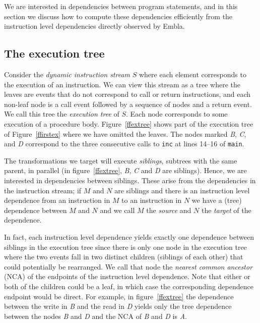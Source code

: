 \documentclass{acm_proc_article-sp}
\begin{document}
We are interested in dependencies between program statements, and in 
this section we discuss how to compute these dependencies efficiently from
the instruction level dependencies directly observed by Embla.

\subsection{The execution tree}

Consider the {\em dynamic instruction stream} $S$ where each element 
corresponds to the execution
of an instruction. We can view this stream as a tree where the leaves are 
events that do not correspond to call or return instructions, and each 
non-leaf node is a call
event followed by a sequence of nodes and a return event. We call
this tree the {\em execution tree} of $S$. 
Each node corresponds to some execution of a procedure body.
Figure~\ref{ffextree} shows part of
the execution tree of Figure~\ref{ffirstex} where we have omitted the 
leaves. The nodes marked {\it B}, {\it C}, and {\it D} correspond to 
the three consecutive calls to {\tt inc} at lines 14--16 of {\tt main}.

The transformations we target will execute {\em siblings}, subtrees with
the same parent, in parallel (in figure~\ref{ffextree}, {\it B}, {\it C} 
and {\it D} are siblings).  Hence, we 
are interested in dependencies between siblings. These
arise from the 
dependencies in the instruction stream; if $M$ and $N$ are siblings and
there is an instruction level dependence from an instruction in $M$ 
to an instruction in $N$ we have a (tree) dependence between $M$ and $N$
and we call $M$ the {\em source} and $N$ the {\em target} of the dependence.

In fact, each instruction level dependence yields exactly one dependence
between siblings in the execution tree since there is only one node
in the execution tree  
where the two events fall in two distinct children (siblings of each other)
that could potentially be rearranged. We call that node the {\em nearest
common ancestor} (NCA) of the endpoints of the instruction level dependence.
Note that either or both of the children could be a leaf, in which case the
corresponding dependence endpoint would be direct.
For example, in figure~\ref{ffextree}
the dependence between the write in {\it B} and the read in {\it D} yields
only the tree dependence between the nodes {\it B} and {\it D} and the NCA of
{\it B} and {\it D} is {\it A}. 
\end{document}
